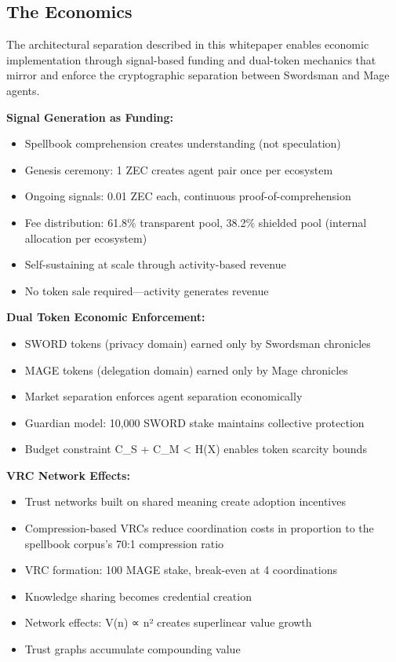 \documentclass[
]{article}
\begin{document}
\subsection{The Economics}\label{the-economics}

The architectural separation described in this whitepaper enables
economic implementation through signal-based funding and dual-token
mechanics that mirror and enforce the cryptographic separation between
Swordsman and Mage agents.

\textbf{Signal Generation as Funding:}

\begin{itemize}
\item
  Spellbook comprehension creates understanding (not speculation)
\item
  Genesis ceremony: 1 ZEC creates agent pair once per ecosystem
\item
  Ongoing signals: 0.01 ZEC each, continuous proof-of-comprehension
\item
  Fee distribution: 61.8\% transparent pool, 38.2\% shielded pool
  (internal allocation per ecosystem)
\item
  Self-sustaining at scale through activity-based revenue
\item
  No token sale required---activity generates revenue
\end{itemize}

\textbf{Dual Token Economic Enforcement:}

\begin{itemize}
\item
  SWORD tokens (privacy domain) earned only by Swordsman chronicles
\item
  MAGE tokens (delegation domain) earned only by Mage chronicles
\item
  Market separation enforces agent separation economically
\item
  Guardian model: 10,000 SWORD stake maintains collective protection
\item
  Budget constraint C\_S + C\_M \textless{} H(X) enables token scarcity
  bounds
\end{itemize}

\textbf{VRC Network Effects:}

\begin{itemize}
\item
  Trust networks built on shared meaning create adoption incentives
\item
  Compression-based VRCs reduce coordination costs in proportion to the
  spellbook corpus's 70:1 compression ratio
\item
  VRC formation: 100 MAGE stake, break-even at 4 coordinations
\item
  Knowledge sharing becomes credential creation
\item
  Network effects: V(n) ∝ n² creates superlinear value growth
\item
  Trust graphs accumulate compounding value
\end{itemize}
\end{document}

